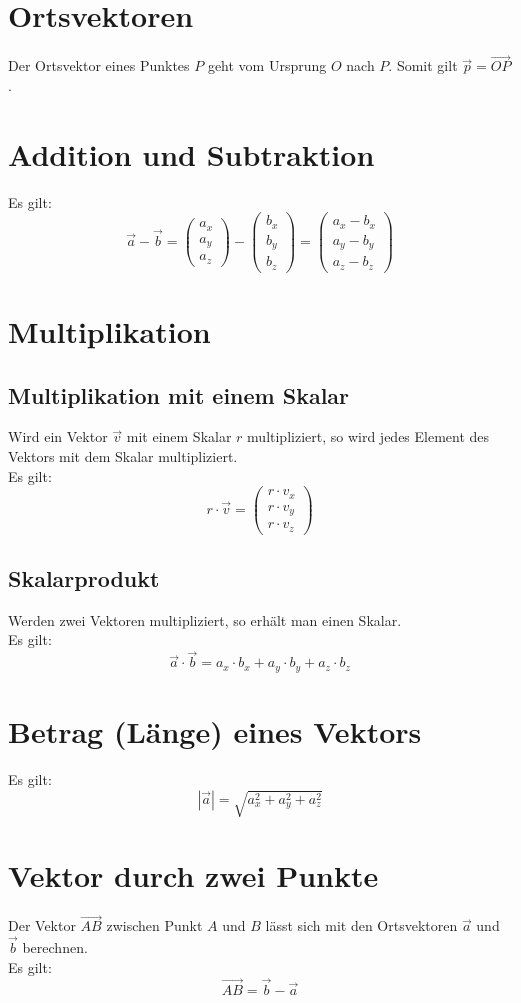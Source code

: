 \documentclass[a4paper,12pt]{article}
\begin{document}
\section{Ortsvektoren}
Der Ortsvektor eines Punktes $P$ geht vom Ursprung $O$ nach $P$. Somit gilt $\vec{p} = \vec{OP}$.
\section{Addition und Subtraktion}
Es gilt:
$$\vec{a} - \vec{b} = \begin{pmatrix}a_x\\a_y\\a_z\end{pmatrix} - \begin{pmatrix}b_x\\b_y\\b_z\end{pmatrix} = \begin{pmatrix}a_x - b_x\\a_y - b_y\\a_z - b_z\end{pmatrix}$$
\section{Multiplikation}
\subsection{Multiplikation mit einem Skalar}
Wird ein Vektor $\vec{v}$ mit einem Skalar $r$ multipliziert, so wird jedes Element des Vektors mit dem Skalar multipliziert.\\
Es gilt:
$$r \cdot \vec{v} = \begin{pmatrix}r \cdot v_x\\r \cdot v_y\\r \cdot v_z\end{pmatrix}$$
\subsection{Skalarprodukt}
Werden zwei Vektoren multipliziert, so erhält man einen Skalar.\\
Es gilt:
$$\vec{a} \cdot \vec{b} = a_x \cdot b_x + a_y \cdot b_y + a_z \cdot b_z$$
\section{Betrag (Länge) eines Vektors}
Es gilt:
$$|\vec{a}| = \sqrt{a_{x}^{2} + a_{y}^{2} + a_{z}^{2}}$$
\section{Vektor durch zwei Punkte}
Der Vektor $\vec{AB}$ zwischen Punkt $A$ und $B$ lässt sich mit den Ortsvektoren $\vec{a}$ und $\vec{b}$ berechnen.\\
Es gilt:
$$\vec{AB} = \vec{b} - \vec{a}$$
\end{document}
